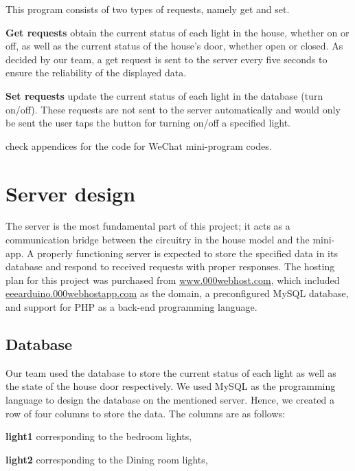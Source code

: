 \documentclass[12pt,a4paper]{report}
\begin{document}
\noindent This program consists of two types of requests, namely get and set. 
\vspace{0.15cm}

\noindent \textbf{Get requests} obtain the current status of each light in the house, whether on or off, as well as the current status of the house's door, whether open or closed. As decided by our team, a get request is sent to the server every five seconds to ensure the reliability of the displayed data.

\vspace{0.15cm}

\noindent \textbf{Set requests} update the current status of each light in the database (turn on/off). These requests are not sent to the server automatically and would only be sent the user taps the button for turning on/off a specified light.
\vspace{0.3cm}

\noindent check appendices for the code for WeChat mini-program codes.

\section {Server design}
The server is the most fundamental part of this project; it acts as a communication bridge between the circuitry in the house model and the mini-app. A properly functioning server is expected to store the specified data in its database and respond to received requests with proper responses. The hosting plan for this project was purchased from \url{www.000webhost.com}, which included \url{eeearduino.000webhostapp.com} as the domain, a preconfigured MySQL database, and support for PHP as a back-end programming language. 


\subsection{Database}
Our team used the database to store the current status of each light as well as the state of the house door respectively. We used MySQL as the programming language to design the database on the mentioned server. Hence, we created a row of four columns to store the data. The columns are as follows: 
\vspace{0.15cm}

\noindent \textbf{light1} corresponding to the bedroom lights, 
\vspace{0.15cm}

\noindent\textbf{light2} corresponding to the Dining room lights,
 \vspace{0.15cm}
 
\end{document}
